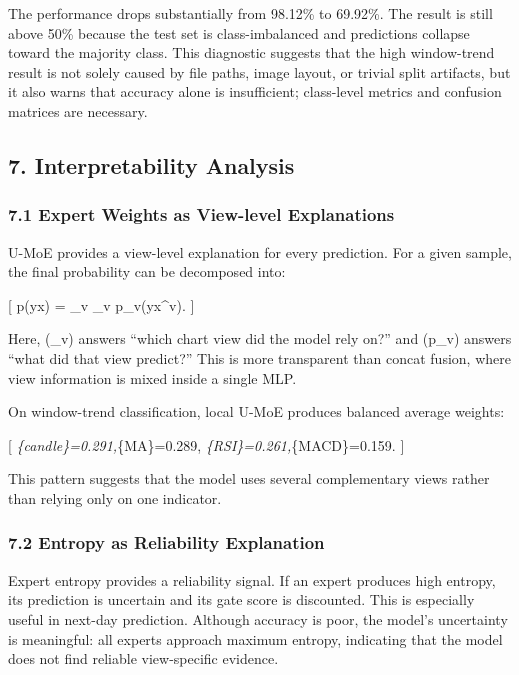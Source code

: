 \documentclass[
]{article}
\begin{document}
The performance drops substantially from 98.12\% to 69.92\%. The result
is still above 50\% because the test set is class-imbalanced and
predictions collapse toward the majority class. This diagnostic suggests
that the high window-trend result is not solely caused by file paths,
image layout, or trivial split artifacts, but it also warns that
accuracy alone is insufficient; class-level metrics and confusion
matrices are necessary.

\subsection{7. Interpretability
Analysis}\label{interpretability-analysis}

\subsubsection{7.1 Expert Weights as View-level
Explanations}\label{expert-weights-as-view-level-explanations}

U-MoE provides a view-level explanation for every prediction. For a
given sample, the final probability can be decomposed into:

{[} p(y\textbar x) = \sum\_v \alpha\_v p\_v(y\textbar x\^{}v). {]}

Here, (\alpha\_v) answers ``which chart view did the model rely on?''
and (p\_v) answers ``what did that view predict?'' This is more
transparent than concat fusion, where view information is mixed inside a
single MLP.

On window-trend classification, local U-MoE produces balanced average
weights:

{[} \alpha\emph{\{candle\}=0.291,\quad \alpha}\{MA\}=0.289,\quad
\alpha\emph{\{RSI\}=0.261,\quad \alpha}\{MACD\}=0.159. {]}

This pattern suggests that the model uses several complementary views
rather than relying only on one indicator.

\subsubsection{7.2 Entropy as Reliability
Explanation}\label{entropy-as-reliability-explanation}

Expert entropy provides a reliability signal. If an expert produces high
entropy, its prediction is uncertain and its gate score is discounted.
This is especially useful in next-day prediction. Although accuracy is
poor, the model's uncertainty is meaningful: all experts approach
maximum entropy, indicating that the model does not find reliable
view-specific evidence.
\end{document}

